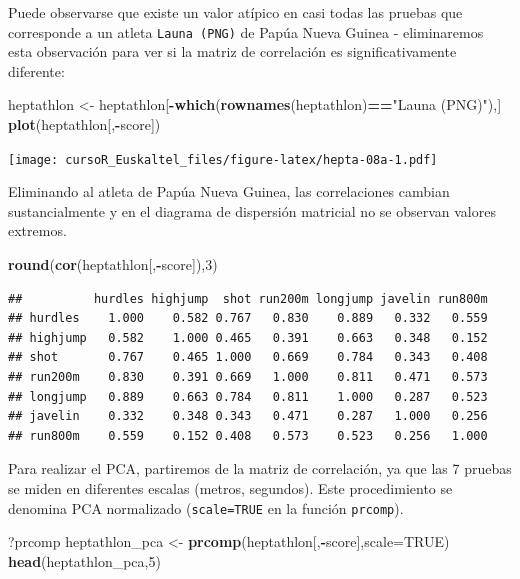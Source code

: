 \documentclass[]{book}
\newenvironment{Shaded}{\begin{snugshade}}{\end{snugshade}}
\newcommand{\KeywordTok}[1]{\textcolor[rgb]{0.13,0.29,0.53}{\textbf{#1}}}
\newcommand{\DataTypeTok}[1]{\textcolor[rgb]{0.13,0.29,0.53}{#1}}
\newcommand{\DecValTok}[1]{\textcolor[rgb]{0.00,0.00,0.81}{#1}}
\newcommand{\StringTok}[1]{\textcolor[rgb]{0.31,0.60,0.02}{#1}}
\newcommand{\OtherTok}[1]{\textcolor[rgb]{0.56,0.35,0.01}{#1}}
\newcommand{\OperatorTok}[1]{\textcolor[rgb]{0.81,0.36,0.00}{\textbf{#1}}}
\newcommand{\NormalTok}[1]{#1}
\begin{document}
Puede observarse que existe un valor atípico en casi todas las pruebas
que corresponde a un atleta \texttt{Launa\ (PNG)} de Papúa Nueva Guinea
- eliminaremos esta observación para ver si la matriz de correlación es
significativamente diferente:

\begin{Shaded}
\begin{Highlighting}[]
\NormalTok{heptathlon <-}\StringTok{ }\NormalTok{heptathlon[}\OperatorTok{-}\KeywordTok{which}\NormalTok{(}\KeywordTok{rownames}\NormalTok{(heptathlon)}\OperatorTok{==}\StringTok{"Launa (PNG)"}\NormalTok{),]}
\KeywordTok{plot}\NormalTok{(heptathlon[,}\OperatorTok{-}\NormalTok{score])}
\end{Highlighting}
\end{Shaded}

\texttt{[image: cursoR\_Euskaltel\_files/figure-latex/hepta-08a-1.pdf]}

Eliminando al atleta de Papúa Nueva Guinea, las correlaciones cambian
sustancialmente y en el diagrama de dispersión matricial no se observan
valores extremos.

\begin{Shaded}
\begin{Highlighting}[]
\KeywordTok{round}\NormalTok{(}\KeywordTok{cor}\NormalTok{(heptathlon[,}\OperatorTok{-}\NormalTok{score]),}\DecValTok{3}\NormalTok{)}
\end{Highlighting}
\end{Shaded}

\begin{verbatim}
##          hurdles highjump  shot run200m longjump javelin run800m
## hurdles    1.000    0.582 0.767   0.830    0.889   0.332   0.559
## highjump   0.582    1.000 0.465   0.391    0.663   0.348   0.152
## shot       0.767    0.465 1.000   0.669    0.784   0.343   0.408
## run200m    0.830    0.391 0.669   1.000    0.811   0.471   0.573
## longjump   0.889    0.663 0.784   0.811    1.000   0.287   0.523
## javelin    0.332    0.348 0.343   0.471    0.287   1.000   0.256
## run800m    0.559    0.152 0.408   0.573    0.523   0.256   1.000
\end{verbatim}

Para realizar el PCA, partiremos de la matriz de correlación, ya que las
7 pruebas se miden en diferentes escalas (metros, segundos). Este
procedimiento se denomina PCA normalizado (\texttt{scale=TRUE} en la
función \texttt{prcomp}).

\begin{Shaded}
\begin{Highlighting}[]
\NormalTok{?prcomp}
\NormalTok{heptathlon_pca <-}\StringTok{ }\KeywordTok{prcomp}\NormalTok{(heptathlon[,}\OperatorTok{-}\NormalTok{score],}\DataTypeTok{scale=}\OtherTok{TRUE}\NormalTok{)}
\KeywordTok{head}\NormalTok{(heptathlon_pca,}\DecValTok{5}\NormalTok{)}
\end{Highlighting}
\end{Shaded}
\end{document}
